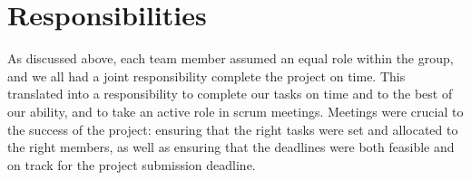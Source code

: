 \section{Responsibilities}

As discussed above, each team member assumed an equal role within the group, and we all had a joint responsibility complete the project on time.
This translated into a responsibility to complete our tasks on time and to the best of our ability, and to take an active role in scrum meetings.
Meetings were crucial to the success of the project: ensuring that the right tasks were set and allocated to the right members, as well as ensuring that the deadlines were both feasible and on track for the project submission deadline.
